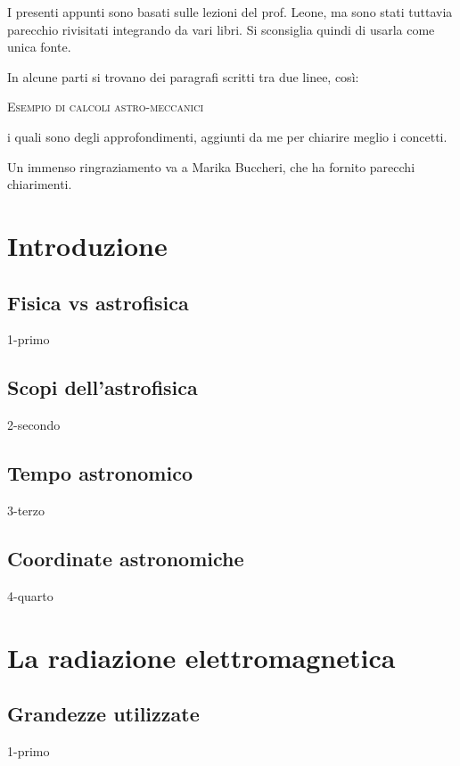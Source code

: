 \documentclass[openany,12pt]{article}
\begin{document}
I presenti appunti sono basati sulle lezioni del prof. Leone, ma sono stati tuttavia parecchio rivisitati integrando da vari libri. Si sconsiglia quindi di usarla come unica fonte.

In alcune parti si trovano dei paragrafi scritti tra due linee, così:

\hrulefill

\begin{center}
  \textsc{Esempio di calcoli astro-meccanici}
\end{center}

\hrulefill

i quali sono degli approfondimenti, aggiunti da me per chiarire meglio i concetti.

Un immenso ringraziamento va a Marika Buccheri, che ha fornito parecchi chiarimenti.

\newpage

\section{Introduzione}

\subsection{Fisica vs astrofisica}
   {1-primo}

   \subsection{Scopi dell'astrofisica}
   {2-secondo}

   \subsection{Tempo astronomico}
   {3-terzo}

   \subsection{Coordinate astronomiche}
   {4-quarto}

\newpage

\section{La radiazione elettromagnetica}

  \subsection{Grandezze utilizzate}
  {1-primo}
\end{document}
